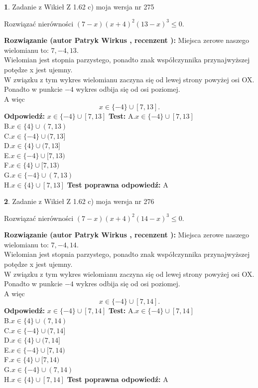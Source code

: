 \documentclass[12pt, a4paper]{article}
\theoremstyle{definition} %
\newtheorem{zad}{}
\newcommand{\zadStart}[1]{\begin{zad}#1\newline}
\newcommand{\zadStop}{\end{zad}}
\newcommand{\rozwStart}[2]{\noindent \textbf{Rozwiązanie (autor #1 , recenzent #2): }\newline}
\newcommand{\rozwStop}{\newline}
\newcommand{\odpStart}{\noindent \textbf{Odpowiedź:}\newline}
\newcommand{\odpStop}{\newline}
\newcommand{\testStart}{\noindent \textbf{Test:}\newline}
\newcommand{\testStop}{\newline}
\newcommand{\kluczStart}{\noindent \textbf{Test poprawna odpowiedź:}\newline}
\newcommand{\kluczStop}{\newline}
\begin{document}
\zadStart{Zadanie z Wikieł Z 1.62 c) moja wersja nr 275}

Rozwiązać nierówności $(7-x)(x+4)^{2}(13-x)^{3}\le0$.
\zadStop
\rozwStart{Patryk Wirkus}{}
Miejsca zerowe naszego wielomianu to: $7, -4, 13$.\\
Wielomian jest stopnia parzystego, ponadto znak współczynnika przy\linebreak najwyższej potędze x jest ujemny.\\ W związku z tym wykres wielomianu zaczyna się od lewej strony powyżej osi OX.\\
Ponadto w punkcie $-4$ wykres odbija się od osi poziomej.\\
A więc $$x \in \{-4\} \cup [7,13].$$
\rozwStop
\odpStart
$x \in \{-4\} \cup [7,13]$
\odpStop
\testStart
A.$x \in \{-4\} \cup [7,13]$\\
B.$x \in \{4\} \cup (7,13)$\\
C.$x \in \{-4\} \cup (7,13]$\\
D.$x \in \{4\} \cup (7,13]$\\
E.$x \in \{-4\} \cup [7,13)$\\
F.$x \in \{4\} \cup [7,13)$\\
G.$x \in \{-4\} \cup (7,13)$\\
H.$x \in \{4\} \cup [7,13]$
\testStop
\kluczStart
A
\kluczStop



\zadStart{Zadanie z Wikieł Z 1.62 c) moja wersja nr 276}

Rozwiązać nierówności $(7-x)(x+4)^{2}(14-x)^{3}\le0$.
\zadStop
\rozwStart{Patryk Wirkus}{}
Miejsca zerowe naszego wielomianu to: $7, -4, 14$.\\
Wielomian jest stopnia parzystego, ponadto znak współczynnika przy\linebreak najwyższej potędze x jest ujemny.\\ W związku z tym wykres wielomianu zaczyna się od lewej strony powyżej osi OX.\\
Ponadto w punkcie $-4$ wykres odbija się od osi poziomej.\\
A więc $$x \in \{-4\} \cup [7,14].$$
\rozwStop
\odpStart
$x \in \{-4\} \cup [7,14]$
\odpStop
\testStart
A.$x \in \{-4\} \cup [7,14]$\\
B.$x \in \{4\} \cup (7,14)$\\
C.$x \in \{-4\} \cup (7,14]$\\
D.$x \in \{4\} \cup (7,14]$\\
E.$x \in \{-4\} \cup [7,14)$\\
F.$x \in \{4\} \cup [7,14)$\\
G.$x \in \{-4\} \cup (7,14)$\\
H.$x \in \{4\} \cup [7,14]$
\testStop
\kluczStart
A
\kluczStop
\end{document}

